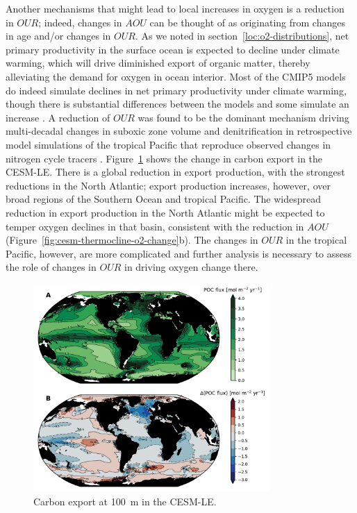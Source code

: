 \documentclass[draft,linenumbers]{report_chapter}
\begin{document}
Another mechanisms that might lead to local increases in oxygen is a reduction in $OUR$; indeed, changes in $AOU$ can be thought of as originating from changes in age and/or changes in $OUR$.
As we noted in section~\ref{loc:o2-distributions}, net primary productivity in the surface ocean is expected to decline under climate warming, which will drive diminished export of organic matter, thereby alleviating the demand for oxygen in ocean interior.
Most of the CMIP5 models do indeed simulate declines in net primary productivity under climate warming, though there is substantial differences between the models and some simulate an increase \citep{Laufkotter-Vogt-etal-2015}.
A reduction of $OUR$ was found to be the dominant mechanism driving multi-decadal changes in suboxic zone volume and denitrification in retrospective model simulations of the tropical Pacific that reproduce observed changes in nitrogen cycle tracers \citep{Deutsch-Brix-etal-2011,Deutsch-Berelson-etal-2014}.
Figure~\ref{fig:cesm-carbon-export} shows the change in carbon export in the CESM-LE.
There is a global reduction in export production, with the strongest reductions in the North Atlantic; export production increases, however, over broad regions of the Southern Ocean and tropical Pacific.
The widespread reduction in export production in the North Atlantic might be expected to temper oxygen declines in that basin, consistent with the reduction in $AOU$ (Figure~\ref{fig:cesm-thermocline-o2-change}b).
The changes in $OUR$ in the tropical Pacific, however, are more complicated and further analysis is necessary to assess the role of changes in $OUR$ in driving oxygen change there.

\begin{figure}[tbp]
\centering
\includegraphics[width=0.8\textwidth]{cesm-export-production.pdf}
\caption{Carbon export at 100~m in the CESM-LE.}
\label{fig:cesm-carbon-export}
\end{figure}
\end{document}
